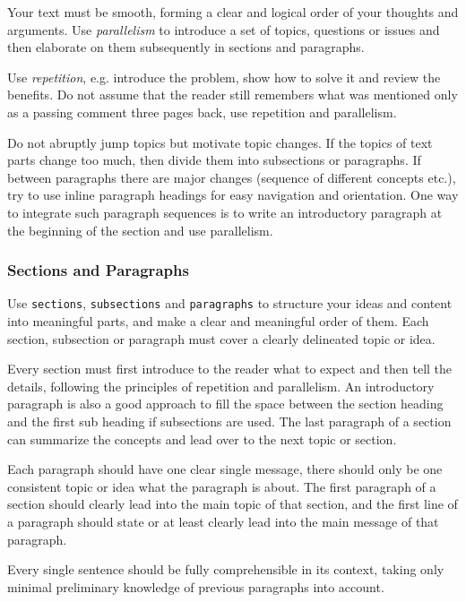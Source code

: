 \documentclass[11pt, a4paper,oneside,chapterprefix=false]{scrbook}
\begin{document}
Your text must be smooth, forming a clear and logical order of your thoughts and arguments. Use \emph{parallelism} to introduce a set of topics, questions or issues and then elaborate on them subsequently in sections and paragraphs.

Use \emph{repetition}, e.g. introduce the problem, show how to solve it and review the benefits. Do not assume that the reader still remembers what was mentioned only as a passing comment three pages back, use repetition and parallelism.

Do not abruptly jump topics but motivate topic changes. If the topics of text parts change too much, then divide them into subsections or paragraphs. If between paragraphs there are major changes (sequence of different concepts etc.), try to use inline paragraph headings for easy navigation and orientation. One way to integrate such paragraph sequences is to write an introductory paragraph at the beginning of the section and use parallelism.

\subsubsection*{Sections and Paragraphs}

Use \texttt{sections}, \texttt{subsections} and \texttt{paragraphs} to structure your ideas and content into meaningful parts, and make a clear and meaningful order of them. Each section, subsection or paragraph must cover a clearly delineated topic or idea.

Every section must first introduce to the reader what to expect and then tell the details, following the principles of repetition and parallelism. An introductory paragraph is also a good approach to fill the space between the section heading and the first sub heading if subsections are used. The last paragraph of a section can summarize the concepts and lead over to the next topic or section.

Each paragraph should have one clear single message, there should only be one consistent topic or idea what the paragraph is about. The first paragraph of a section should clearly lead into the main topic of that section, and the first line of a paragraph should state or at least clearly lead into the main message of that paragraph.

Every single sentence should be fully comprehensible in its context, taking only minimal preliminary knowledge of previous paragraphs into account.
\end{document}
